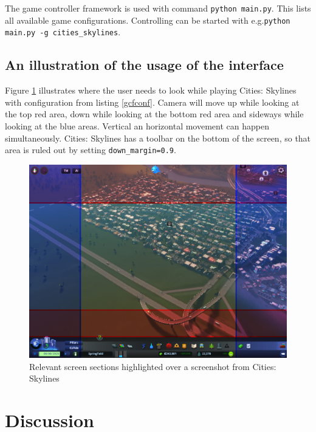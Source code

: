 \documentclass[english]{tktltiki}
\begin{document}
The game controller framework is used with command \verb|python main.py|. This lists all available game configurations. Controlling can be started with e.g.\newline \verb|python main.py -g cities_skylines|.

\subsection{An illustration of the usage of the interface}

Figure \ref{citiesskylines} illustrates where the user needs to look while playing Cities: Skylines with configuration from listing \ref{gcfconf}. Camera will move up while looking at the top red area, down while looking at the bottom red area and sideways while looking at the blue areas. Vertical an horizontal movement can happen simultaneously. Cities: Skylines has a toolbar on the bottom of the screen, so that area is ruled out by setting \verb|down_margin=0.9|.

\begin{figure}[h]
\begin{center}
\includegraphics[width=1\textwidth]{cities_skylines.png}
\caption{Relevant screen sections highlighted over a screenshot from Cities: Skylines}
\label{citiesskylines}
\end{center}
\end{figure}



\section{Discussion}
\end{document}
